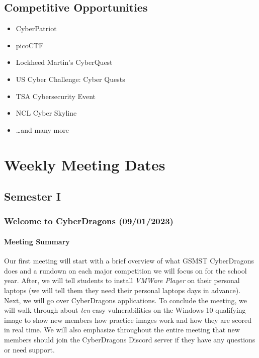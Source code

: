 \documentclass[
  letterpaper,
  DIV=11,
  numbers=noendperiod]{scrartcl}
\let\oldparagraph\paragraph
\renewcommand{\paragraph}[1]{\oldparagraph{#1}\mbox{}}
\providecommand{\tightlist}{%
  \setlength{\itemsep}{0pt}\setlength{\parskip}{0pt}}\usepackage{longtable,booktabs,array}
\begin{document}
\hypertarget{competitive-opportunities}{%
\subsection{Competitive Opportunities}\label{competitive-opportunities}}

\begin{itemize}
\tightlist
\item
  CyberPatriot
\item
  picoCTF
\item
  Lockheed Martin's CyberQuest
\item
  US Cyber Challenge: Cyber Quests
\item
  TSA Cybersecurity Event
\item
  NCL Cyber Skyline
\item
  \ldots and many more
\end{itemize}

\hypertarget{weekly-meeting-dates}{%
\section{Weekly Meeting Dates}\label{weekly-meeting-dates}}

\hypertarget{semester-i}{%
\subsection{Semester I}\label{semester-i}}

\hypertarget{welcome-to-cyberdragons-09012023}{%
\subsubsection{Welcome to CyberDragons
(09/01/2023)}\label{welcome-to-cyberdragons-09012023}}

\hypertarget{meeting-summary}{%
\paragraph{Meeting Summary}\label{meeting-summary}}

Our first meeting will start with a brief overview of what GSMST
CyberDragons does and a rundown on each major competition we will focus
on for the school year. After, we will tell students to install
\emph{VMWare Player} on their personal laptops (we will tell them they
need their personal laptops days in advance). Next, we will go over
CyberDragons applications. To conclude the meeting, we will walk through
about \emph{ten} easy vulnerabilities on the Windows 10 qualifying image
to show new members how practice images work and how they are scored in
real time. We will also emphasize throughout the entire meeting that new
members should join the CyberDragons Discord server if they have any
questions or need support.
\end{document}
